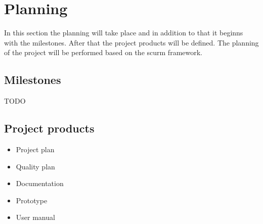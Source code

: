\section{Planning}
In this section the planning will take place and in addition to that it beginns with the milestones.
After that the project products will be defined. The planning of the project will be performed based on the  scurm framework.

    \subsection{Milestones}
    TODO

    \subsection{Project products}
    \begin{itemize}
        \item Project plan
        \item Quality plan
        \item Documentation
        \item Prototype
        \item User manual
    \end{itemize}